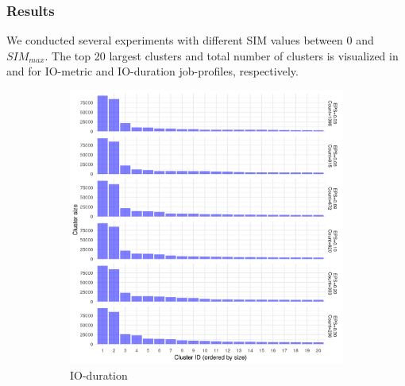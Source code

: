 \documentclass[]{llncs}
\begin{document}
\subsubsection{Results}
We conducted several experiments with different SIM values between 0 and $SIM_{max}$.
The top 20 largest clusters and total number of clusters is visualized in  and  for IO-metric and IO-duration job-profiles, respectively.

\begin{figure}
	\begin{subfigure}[t]{0.45\textwidth}
	\includegraphics[width=\textwidth]{./media/image10.png}
	\caption{IO-duration}
	\label{fig:datasets_clustering_results:io_duration}
 \end{subfigure}
 \hfill
 \begin{subfigure}[t]{0.45\textwidth}

\end{subfigure}
\end{figure}
\end{document}
